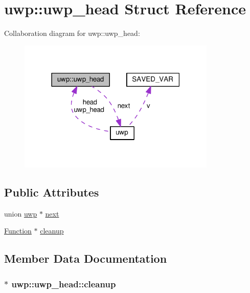 \hypertarget{structuwp_1_1uwp__head}{}\section{uwp\+:\+:uwp\+\_\+head Struct Reference}
\label{structuwp_1_1uwp__head}


Collaboration diagram for uwp\+:\+:uwp\+\_\+head\+:
\nopagebreak
\begin{figure}[H]
\begin{center}
\leavevmode
\includegraphics[width=267pt]{structuwp_1_1uwp__head__coll__graph}
\end{center}
\end{figure}
\subsection*{Public Attributes}
\begin{DoxyCompactItemize}
\item 
union \hyperlink{unionuwp}{uwp} $\ast$ \hyperlink{structuwp_1_1uwp__head_ac52194b98a40d4432fcb9fcb0b7f385a}{next}
\item 
\hyperlink{input_8h_a38bf8b007a281c3c96504ad1d2614af4}{Function} $\ast$ \hyperlink{structuwp_1_1uwp__head_a6a361d6a2bd14b7ec7ccfda34b860dac}{cleanup}
\end{DoxyCompactItemize}


\subsection{Member Data Documentation}
\subsubsection[{\texorpdfstring{cleanup}{cleanup}}]{$\ast$ uwp\+::uwp\+\_\+head\+::cleanup}\hypertarget{structuwp_1_1uwp__head_a6a361d6a2bd14b7ec7ccfda34b860dac}{}\label{structuwp_1_1uwp__head_a6a361d6a2bd14b7ec7ccfda34b860dac}
